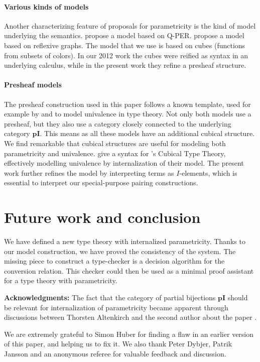 \documentclass[english]{PaperTools/latex/entcs}
\theoremstyle{plain}
\theoremstyle{definition}
\theoremstyle{remark}
\def\pI{\ensuremath{\mathbf{pI}}}
\begin{document}
\paragraph{Various kinds of models}
Another characterizing feature of proposals for parametricity is the
kind of model underlying the
semantics.  propose a model
based on Q-PER.  propose a model based
on reflexive graphs. The model that we use is based on cubes
(functions from subsets of colors). In
our 2012 work the cubes were reified as syntax in
an underlying calculus, while in the present work they refine a presheaf structure.

\paragraph{Presheaf models}
The presheaf construction used in this paper follows a known template,
used for example by \citet{bezem2014model} and \citet{DBLP:journals/corr/Pitts14}
to model univalence in type theory. Not only both models use a
presheaf, but they also use a category closely connected to the
underlying category $\pI$.
This means as all these models have an additional cubical structure.
We find remarkable that cubical structures are useful for modeling both
parametricity and univalence.
\citet{altenkirch2014syntax} give a syntax for
\citeauthor{bezem2014model}'s Cubical Type Theory, effectively modelling
univalence by internalization of their model.
The present work further refines the model by interpreting terms as
$I$-elements, which is essential to interpret our special-purpose
pairing constructions.

\section{Future work and conclusion}
We have defined a new type theory with internalized parametricity.
Thanks to our model construction, we have proved the consistency of
the system. The missing piece to construct a type-checker is a
decision algorithm for the conversion relation.  This checker could
then be used as a minimal proof assistant for a type theory with
parametricity.

\bigskip
\noindent
\textbf{Acknowledgments:}
The fact that the category of partial bijections \pI{} should be
relevant for internalization of parametricity became apparent through
discussions between Thorsten Altenkirch and the second  author about
the paper \citep{bernardy_computational_2012}.

We are extremely grateful to Simon Huber for finding a flaw in an
earlier version of this paper, and helping us to fix it.
We also thank Peter Dybjer, Patrik Jansson and an anonymous referee for
valuable feedback and discussion.

\newcommand{\newblock}{}


\end{document}
